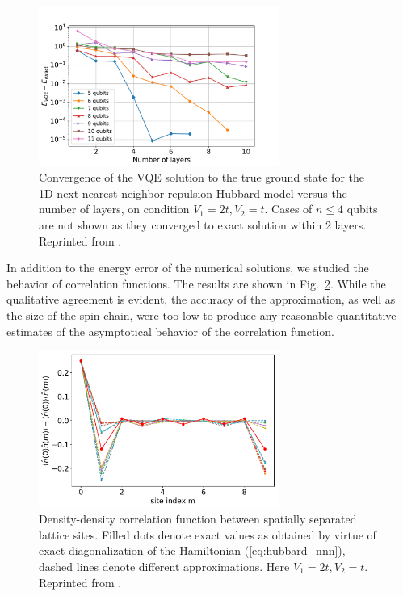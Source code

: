 \begin{figure}
    \centering
    \includegraphics[width=0.7\textwidth]{../figures/vqe_hubbard_nnn.pdf}
    \caption{Convergence of the VQE solution to the true ground state for the 1D next-nearest-neighbor repulsion Hubbard model versus the number of layers, on condition $V_1 = 2t, V_2 = t$. Cases of $n \leq 4$ qubits are not shown as they converged to exact solution within 2 layers. Reprinted from \cite{uvarov_variational_2020}.}
    \label{fig:vqe_hubbard_nnn}
\end{figure}

In addition to the energy error of the numerical solutions, we studied the behavior of correlation functions. The results are shown in Fig.~\ref{fig:correlation}. While the qualitative agreement is evident, the accuracy of the approximation, as well as the size of the spin chain, were too low to produce any reasonable quantitative estimates of the asymptotical behavior of the correlation function.

\begin{figure}
    \centering
    \includegraphics*[width=0.7\textwidth]{../figures/Correlation.pdf}
    \caption{Density-density correlation function between spatially separated lattice sites. Filled dots denote exact values as obtained by virtue of exact diagonalization of the Hamiltonian (\ref{eq:hubbard_nnn}), dashed lines denote different approximations. Here $V_1 = 2t, V_2 = t$. Reprinted from \cite{uvarov_variational_2020}.}
    \label{fig:correlation}
\end{figure}

